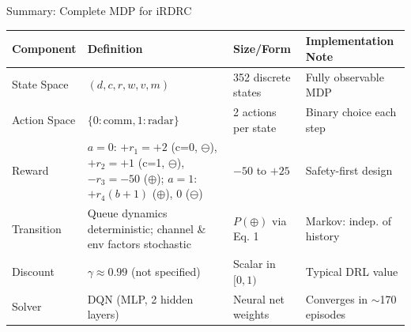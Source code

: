 \documentclass{beamer}
\begin{document}
\begin{frame}{Summary: Complete MDP for iRDRC}
  \small
  \begin{tabular}{|p{1.5cm}|p{2.3cm}|p{1.7cm}|p{3.2cm}|}
    \hline
    \textbf{Component} & \textbf{Definition} & \textbf{Size/Form} & \textbf{Implementation Note} \\
    \hline
    State Space & $(d, c, r, w, v, m)$ & 352 discrete states & Fully observable MDP \\
    \hline
    Action Space & $\{0: \text{comm}, 1: \text{radar}\}$ & 2 actions per state & Binary choice each step \\
    \hline
    Reward & $a=0$: $+r_1=+2$ (c=0, $\ominus$), $+r_2=+1$ (c=1, $\ominus$), $-r_3=-50$ ($\oplus$); $a=1$: $+r_4(b+1)$ ($\oplus$), $0$ ($\ominus$) & $-50$ to $+25$ & Safety-first design \\
    \hline
    Transition & Queue dynamics deterministic; channel \& env factors stochastic & $P(\oplus)$ via Eq. 1 & Markov: indep. of history \\
    \hline
    Discount & $\gamma \approx 0.99$ (not specified) & Scalar in $[0,1)$ & Typical DRL value \\
    \hline
    Solver & DQN (MLP, 2 hidden layers) & Neural net weights & Converges in $\sim$170 episodes \\
    \hline
  \end{tabular}
\end{frame}
\end{document}
